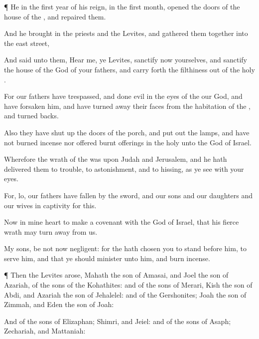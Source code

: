 {\par }{\PP {}¶ He in the
first
year of his
reign, in the
first
month,
opened the
doors of the
house of the
{}, and
repaired them.

And he brought
in the
priests and the
Levites, and gathered them
together into the
east
street,

And
said unto them,
Hear me, ye
Levites,
sanctify now yourselves, and
sanctify the
house of the
{}
God of your
fathers, and carry
forth the
filthiness out of the
holy
{}.

For our
fathers have
trespassed, and
done
{}
evil in the
eyes of the
{} our
God, and have
forsaken him, and have turned
away their
faces from the
habitation of the
{}, and
turned
{}
backs.

Also they have shut
up the
doors of the
porch, and put
out the
lamps, and have not
burned
incense nor
offered burnt
offerings in the
holy
{} unto the
God of
Israel.

Wherefore the
wrath of the
{} was upon
Judah and
Jerusalem, and he hath
delivered them to
trouble, to
astonishment, and to
hissing, as ye
see with your
eyes.

For, lo, our
fathers have
fallen by the
sword, and our
sons and our
daughters and our
wives
{} in
captivity for this.

Now
{} in mine
heart to
make a
covenant with the
{}
God of
Israel, that his
fierce
wrath may turn
away from us.

My
sons, be not now
negligent: for the
{} hath
chosen you to
stand
before him, to
serve him, and that ye should
minister unto him, and burn
incense.


\par }{\PP {}¶ Then the
Levites
arose,
Mahath the
son of
Amasai, and
Joel the
son of
Azariah, of the
sons of the
Kohathites: and of the
sons of
Merari,
Kish the
son of
Abdi, and
Azariah the
son of
Jehalelel: and of the
Gershonites;
Joah the
son of
Zimmah, and
Eden the
son of
Joah:

And of the
sons of
Elizaphan;
Shimri, and
Jeiel: and of the
sons of
Asaph;
Zechariah, and
Mattaniah:

}
